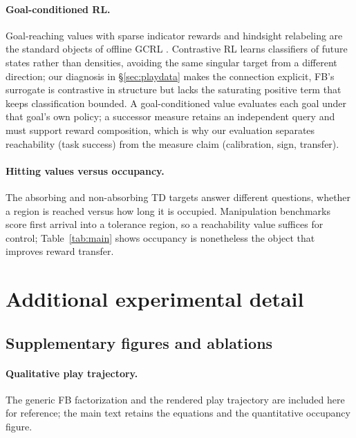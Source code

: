 \documentclass{article}
\begin{document}
\paragraph{Goal-conditioned RL.}
Goal-reaching values with sparse indicator rewards and hindsight relabeling are the standard objects of offline GCRL \citep{kaelbling1993learning,andrychowicz2017hindsight,kostrikov2021offline,park2023hiql}.
Contrastive RL \citep{eysenbach2022contrastive} learns classifiers of future states rather than densities, avoiding the same singular target from a different direction; our diagnosis in \S\ref{sec:playdata} makes the connection explicit, FB's surrogate is contrastive in structure but lacks the saturating positive term that keeps classification bounded.
A goal-conditioned value evaluates each goal under that goal's own policy; a successor measure retains an independent query and must support reward composition, which is why our evaluation separates reachability (task success) from the measure claim (calibration, sign, transfer).

\paragraph{Hitting values versus occupancy.}
The absorbing and non-absorbing TD targets answer different questions, whether a region is reached versus how long it is occupied.
Manipulation benchmarks score first arrival into a tolerance region, so a reachability value suffices for control; Table~\ref{tab:main} shows occupancy is nonetheless the object that improves reward transfer.




\appendix
\section{Additional experimental detail}
\label{app:detail}


\subsection{Supplementary figures and ablations}
\label{app:supplementary-figures}

\paragraph{Qualitative play trajectory.}
The generic FB factorization and the rendered play trajectory are included here for reference; the main text retains the equations and the quantitative occupancy figure.
\end{document}
